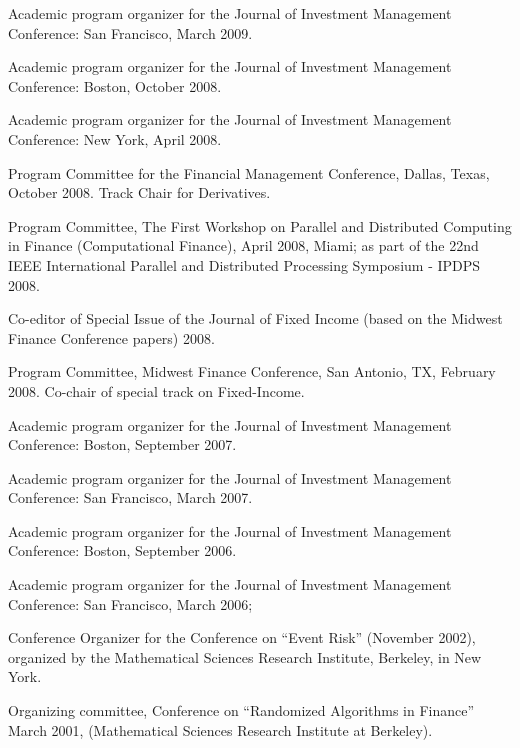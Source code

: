 \documentclass{article}
\begin{document}
\begin{description}
\begin{etaremune}
\item Academic program organizer for the Journal of Investment Management Conference: San Francisco, March 2009.

\item Academic program organizer for the Journal of Investment Management Conference: Boston, October 2008. 

\item Academic program organizer for the Journal of Investment Management Conference: New York, April 2008. 

\item Program Committee for the Financial Management Conference, Dallas, Texas, October 2008. Track Chair for Derivatives. 
 
\item Program Committee, The First Workshop on Parallel and Distributed Computing in Finance (Computational Finance), April 2008, Miami; as part of the 22nd IEEE International Parallel and Distributed Processing Symposium - IPDPS 2008.

\item Co-editor of Special Issue of the Journal of Fixed Income (based on the Midwest Finance Conference papers) 2008.

\item Program Committee, Midwest Finance Conference, San Antonio, TX, February 2008. Co-chair of special track on Fixed-Income.

\item Academic program organizer for the Journal of Investment Management Conference: Boston, September 2007. 

\item Academic program organizer for the Journal of Investment Management Conference: San Francisco, March 2007.

\item Academic program organizer for the Journal of Investment Management Conference: Boston, September 2006. 

\item Academic program organizer for the Journal of Investment Management Conference: San Francisco, March 2006; 

\item Conference Organizer for the Conference on ``Event Risk'' (November 2002), organized by the Mathematical Sciences Research Institute, Berkeley, in New York.

\item Organizing committee, Conference on ``Randomized Algorithms in Finance'' March 2001, (Mathematical Sciences Research Institute at Berkeley).

\end{etaremune}

\end{description}
\end{document}
